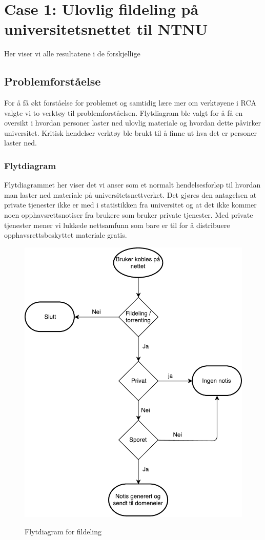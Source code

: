 \section{Case 1: Ulovlig fildeling på universitetsnettet til NTNU}
Her viser vi alle resultatene i de forskjellige 

\subsection{Problemforståelse}
For å få økt forståelse for problemet og samtidig lære mer om verktøyene i RCA\cite{RCA} valgte vi to verktøy til problemforståelsen. Flytdiagram ble valgt for å få en oversikt i hvordan personer laster ned ulovlig materiale og hvordan dette påvirker universitet. Kritisk hendelser verktøy ble brukt til å finne ut hva det er personer laster ned.  
\subsubsection{Flytdiagram}
Flytdiagrammet her viser det vi anser som et normalt hendelsesforløp til hvordan man laster ned materiale på universitetsnettverket. Det gjøres den antagelsen at private tjenester ikke er med i statistikken fra universitet og at det ikke kommer noen opphavsrettsnotiser fra brukere som bruker private tjenester. Med private tjenester mener vi lukkede nettsamfunn som bare er til for å distribuere opphavsrettsbeskyttet materiale gratis.

\begin{figure}[H]
    \centering
    \includegraphics[scale=0.5]{case_1/bilder/Flowchart.pdf}
    \label{fig:Flytdiagram}
    \caption[Flytdiagram for fildeling]{Flytdiagram for fildeling}
\end{figure}

